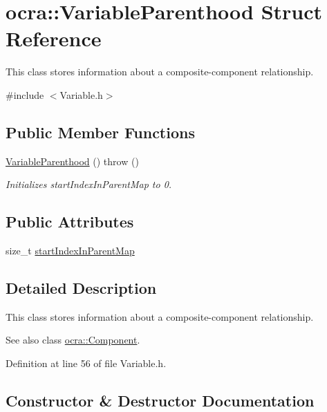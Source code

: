 \hypertarget{structocra_1_1VariableParenthood}{}\section{ocra\+:\+:Variable\+Parenthood Struct Reference}
\label{structocra_1_1VariableParenthood}


This class stores information about a composite-\/component relationship.  




{\ttfamily \#include $<$Variable.\+h$>$}

\subsection*{Public Member Functions}
\begin{DoxyCompactItemize}
\item 
\hyperlink{structocra_1_1VariableParenthood_a5c25166e583bfc9edfc5bf4ddde0cc08}{Variable\+Parenthood} ()  throw ()
\begin{DoxyCompactList}\small\item\em Initializes start\+Index\+In\+Parent\+Map to 0. \end{DoxyCompactList}\end{DoxyCompactItemize}
\subsection*{Public Attributes}
\begin{DoxyCompactItemize}
\item 
size\+\_\+t \hyperlink{structocra_1_1VariableParenthood_a94549ed54ec259fda2c6ba07de66937a}{start\+Index\+In\+Parent\+Map}
\end{DoxyCompactItemize}


\subsection{Detailed Description}
This class stores information about a composite-\/component relationship. 

\begin{DoxySeeAlso}{See also}
class \hyperlink{classocra_1_1Component}{ocra\+::\+Component}. 
\end{DoxySeeAlso}


Definition at line 56 of file Variable.\+h.



\subsection{Constructor \& Destructor Documentation}
